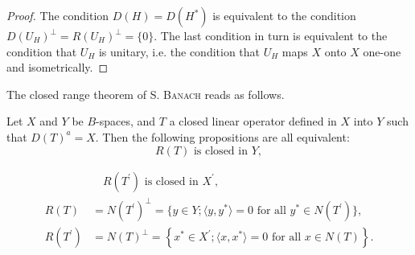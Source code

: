 \begin{proof}
 The condition $D(H) = D(H^{*})$ is equivalent to the condition $D(U_{H})^{\perp} = R(U_{H})^{\perp} = \{0\}$. The last condition in turn is equivalent to the condition that $U_{H}$ is unitary, i.e. the condition that $U_{H}$ maps $X$ onto $X$ one-one and isometrically. 
\end{proof}


\label{sec:VII.5}

The closed range theorem of S. \textsc{Banach} \cite{banach9} reads as follows. 

\begin{theoremu} Let $X$ and $Y$ be $B$-spaces, and $T$ a closed linear operator defined in $X$ into $Y$ such that $D(T)^{a} = X$. Then the following propositions are all equivalent: 
\begin{equation}\label{eq:VII.5.1}
R(T) \text{ is closed in } Y,
\end{equation}
\end{theoremu}

\begin{align}
&\quad R \left(T ^{\prime}\right) \text{ is closed in } X ^{\prime}, \label{eq:VII.5.2} \\
R (T)& = N \left(T ^{\prime}\right) ^{\perp} = \{y \in Y; \langle y, y ^{*} \rangle = 0 \text{ for all } y ^{*} \in N \left(T ^{\prime}\right) \}, \label{eq:VII.5.3} \\
R (T ^{\prime})& = N (T) ^{\perp} = \left\{x ^{*} \in X ^{\prime}; \langle x, x ^{*} \rangle = 0 \text{ for all } x \in N (T) \right\}. \label{eq:VII.5.4}
\end{align}

